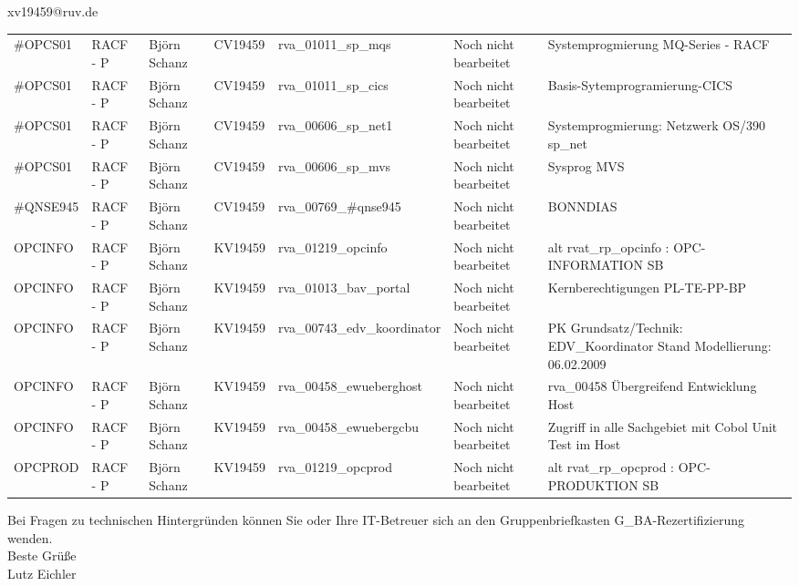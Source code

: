 \documentclass[a4paper,landscape,12pt]{letter}
\begin{document}
\begin{letter}{xv19459@ruv.de\hfill \break}
\begin{tiny}
\begin{longtable}{|p{35mm}|p{15mm}|p{25mm}|p{10mm}|p{40mm}|p{50mm}|p{50mm}|}
\#OPCS01 & RACF - P & Björn Schanz & CV19459 & rva\_01011\_sp\_mqs & Noch nicht bearbeitet & Systemprogmierung MQ-Series - RACF \\
\#OPCS01 & RACF - P & Björn Schanz & CV19459 & rva\_01011\_sp\_cics & Noch nicht bearbeitet & Basis-Sytemprogramierung-CICS \\
\#OPCS01 & RACF - P & Björn Schanz & CV19459 & rva\_00606\_sp\_net1 & Noch nicht bearbeitet & Systemprogmierung: Netzwerk OS/390 sp\_net \\
\#OPCS01 & RACF - P & Björn Schanz & CV19459 & rva\_00606\_sp\_mvs & Noch nicht bearbeitet & Sysprog MVS \\
\#QNSE945 & RACF - P & Björn Schanz & CV19459 & rva\_00769\_\#qnse945 & Noch nicht bearbeitet & BONNDIAS \\
OPCINFO & RACF - P & Björn Schanz & KV19459 & rva\_01219\_opcinfo & Noch nicht bearbeitet & alt rvat\_rp\_opcinfo          : OPC- INFORMATION                         SB \\
OPCINFO & RACF - P & Björn Schanz & KV19459 & rva\_01013\_bav\_portal & Noch nicht bearbeitet & Kernberechtigungen PL-TE-PP-BP \\
OPCINFO & RACF - P & Björn Schanz & KV19459 & rva\_00743\_edv\_koordinator & Noch nicht bearbeitet & PK Grundsatz/Technik: EDV\_Koordinator Stand Modellierung: 06.02.2009 \\
OPCINFO & RACF - P & Björn Schanz & KV19459 & rva\_00458\_ewueberghost & Noch nicht bearbeitet & rva\_00458 Übergreifend Entwicklung Host \\
OPCINFO & RACF - P & Björn Schanz & KV19459 & rva\_00458\_ewuebergcbu & Noch nicht bearbeitet & Zugriff in alle Sachgebiet mit Cobol Unit Test im Host \\
OPCPROD & RACF - P & Björn Schanz & KV19459 & rva\_01219\_opcprod & Noch nicht bearbeitet & alt rvat\_rp\_opcprod          : OPC-PRODUKTION                           SB \\

\hline
		\end{longtable}
		\end{tiny}
	
\begin{minipage}{\textwidth}
			Bei Fragen zu technischen Hintergründen können Sie 
			oder Ihre IT-Betreuer sich an den Gruppenbriefkasten 
			G\_BA-Rezertifizierung
			wenden.\\
			\linebreak
			Beste Grüße\\
			Lutz Eichler
	\end{minipage}
	\end{letter}
	
\end{document}
